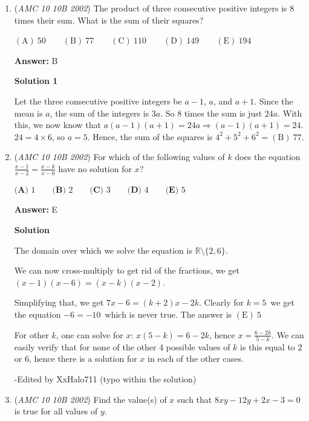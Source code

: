 \begin{enumerate}
 -monkey\_land

 


	\item (\textit{AMC 10 10B 2002}) The product of three consecutive positive integers is $8$ times their sum. What is the sum of their squares?


 $\mathrm{(A) \ } 50\qquad \mathrm{(B) \ } 77\qquad \mathrm{(C) \ } 110\qquad \mathrm{(D) \ } 149\qquad \mathrm{(E) \ } 194$

 \textbf{Answer: }B



\textbf{Solution 1}

Let the three consecutive positive integers be $a-1$, $a$, and $a+1$. Since the mean is $a$, the sum of the integers is $3a$. So $8$ times the sum is just $24a$. With this, we now know that $a(a-1)(a+1)=24a\Rightarrow(a-1)(a+1)=24$.  $24=4\times6$, so $a=5$. Hence, the sum of the squares is $4^2+5^2+6^2=\boxed{\mathrm{ (B)}\ 77}$.

 


	\item (\textit{AMC 10 10B 2002}) For which of the following values of $k$ does the equation $\frac{x-1}{x-2} = \frac{x-k}{x-6}$ have no solution for $x$?


 $\textbf{(A) } 1\qquad \textbf{(B) } 2\qquad \textbf{(C) } 3\qquad \textbf{(D) } 4\qquad \textbf{(E) } 5$

 \textbf{Answer: }E



\textbf{Solution}

The domain over which we solve the equation is $\mathbb{R} \setminus \{2,6\}$.

 We can now cross-multiply to get rid of the fractions, we get $(x-1)(x-6)=(x-k)(x-2)$.

 Simplifying that, we get $7x-6 = (k+2)x - 2k$. Clearly for $k=5$ we get the equation $-6=-10$ which is never true. The answer is $\boxed{\mathrm{ (E)}\ 5}$

 
For other $k$, one can solve for $x$: $x(5-k) = 6-2k$, hence $x=\frac {6-2k}{5-k}$. We can easily verify that for none of the other 4 possible values of $k$ is this equal to $2$ or $6$, hence there is a solution for $x$ in each of the other cases.

 -Edited by XxHalo711 (typo within the solution)

 


	\item (\textit{AMC 10 10B 2002}) Find the value(s) of $x$ such that $8xy - 12y + 2x - 3 = 0$ is true for all values of $y$.



\end{enumerate}
